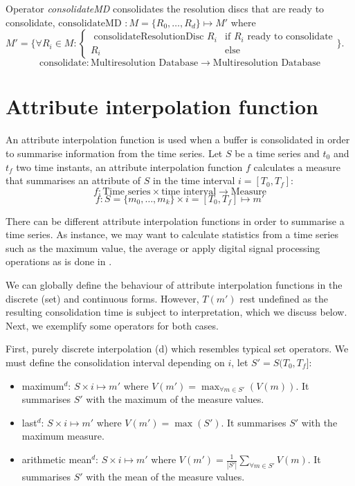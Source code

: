 Operator \emph{consolidateMD} consolidates the resolution discs that
are ready to consolidate, $\text{consolidateMD } :
M=\{R_0,\dotsc,R_d\} \mapsto M'$ where $ M'= \big\{ \forall R_i\in M:
  \begin{cases}
    \text{ consolidateResolutionDisc } R_i & \text{if } R_i \text{ ready to consolidate} \\
    R_i & \text{else }
  \end{cases}\big\}
  $.
\[
\text{consolidate}: \text{Multiresolution Database} \longrightarrow
\text{Multiresolution Database}
  \]








\section{Attribute interpolation function}
\label{sec:model:interpolador}


An attribute interpolation function is used when a buffer is
consolidated in order to summarise information from the time series.
Let $S$ be a time series and $t_0$ and $t_f$ two time instants, an
attribute interpolation function $f$ calculates a measure that
summarises an attribute of $S$ in the time interval $i=[T_0,T_f]$:
\[
f: \text{Time series} \times \text{time interval} \longrightarrow
\text{Measure}
\]
\[
f: S=\{m_0,\ldots,m_k\} \times i=[T_0,T_f] \mapsto m'
\]

There can be different attribute interpolation functions in order to
summarise a time series. As instance, we may want to calculate
statistics from a time series such as the maximum value, the average
or apply digital signal processing operations as is done in
\cite{zhang11}.


We can globally define the behaviour of attribute interpolation
functions in the discrete (set) and continuous forms. However, $T(m')$
rest undefined as the resulting consolidation time is subject to
interpretation, which we discuss below. Next, we exemplify some
operators for both cases.

First, purely discrete interpolation (d) which resembles typical set
operators. We must define the consolidation interval depending on $i$,
let $S'=S(T_0,T_f]$:
\begin{itemize}
\item maximum$^d$: $S \times i \mapsto m'$ where $V(m') = \max_{\forall m
    \in S'}(V(m))$. It summarises $S'$ with the maximum of
  the measure values.
\item last$^d$: $S \times i \mapsto m'$ where $V(m') = \max(S')$. It
  summarises $S'$ with the maximum measure.
\item arithmetic mean$^d$: $S \times i \mapsto m'$ where $V(m') =
  \frac{1}{|S'|} \sum\limits_{\forall m\in S'} V(m)$. It
  summarises $S'$ with the mean of the measure values.
\end{itemize}


